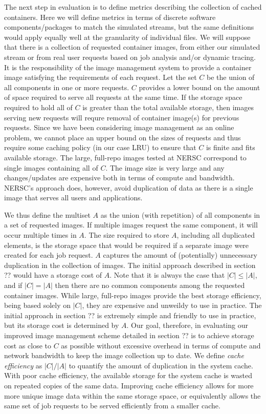 \documentclass[sigconf]{acmart}
\begin{document}
The next step in evaluation is to define metrics describing the collection of cached containers.
Here we will define metrics in terms of discrete software components/packages to match the simulated streams,
but the same definitions would apply equally well at the granularity of individual files.
We will suppose that there is a collection of requested container images,
from either our simulated stream or from real user requests based on job analysis and/or dynamic tracing.
It is the responsibility of the image management system to provide a container image satisfying the requirements of each request.
Let the set $C$ be the union of all components in one or more requests.
$C$ provides a lower bound on the amount of space required to serve all requests at the same time.
If the storage space required to hold all of $C$ is greater than the total available storage,
then images serving new requests will requre removal of container image(s) for previous requests.
Since we have been considering image management as an online problem,
we cannot place an upper bound on the sizes of requests and thus require some caching policy
(in our case LRU) to ensure that $C$ is finite and fits available storage.
The large, full-repo images tested at NERSC correspond to single images containing all of $C$.
The image size is very large and any changes/updates are expensive both in terms of compute and bandwidth.
NERSC's approach does, however,
avoid duplication of data as there is a single image that serves all users and applications.

We thus define the multiset $A$ as the union (with repetition) of all components in a set of requested images.
If multiple images request the same component,
it will occur multiple times in $A$.
The size required to store $A$,
including all duplicated elements,
is the storage space that would be required if a separate image were created for each job request.
$A$ captures the amount of (potentially) unnecessary duplication in the collection of images.
The initial approach described in section ?? would have a storage cost of $A$.
Note that it is always the case that $|C| \leq |A|$,
and if $|C| = |A|$ then there are no common components among the requested container images.
While large, full-repo images provide the best storage efficiency, being based solely on $|C|$,
they are expensive and unweildy to use in practice.
The initial approach in section ?? is extremely simple and friendly to use in practice,
but its storage cost is determined by $A$.
Our goal, therefore, in evaluating our improved image management scheme detailed in section ?? is to achieve storage cost as close to $C$ as possible without excessive overhead in terms of compute and network bandwidth to keep the image collection up to date.
We define \emph{cache efficiency} as $|C| / |A|$ to quantify the amount of duplication in the system cache.
With poor cache efficiency,
the available storage for the system cache is wasted on repeated copies of the same data.
Improving cache efficiency allows for more more unique image data within the same storage space,
or equivalently allows the same set of job requests to be served efficiently from a smaller cache.
\fi
\end{document}
